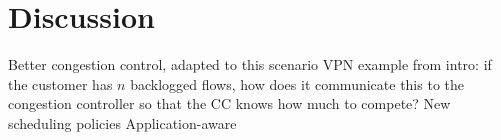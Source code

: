 \section{Discussion}\label{s:discussion}

\begin{outline}
\1 Better congestion control, adapted to this scenario
    \2 VPN example from intro: if the customer has $n$ backlogged flows, how does it communicate this to the congestion controller so that the CC knows how much to compete?
\1 New scheduling policies
    \2 Application-aware
\end{outline}